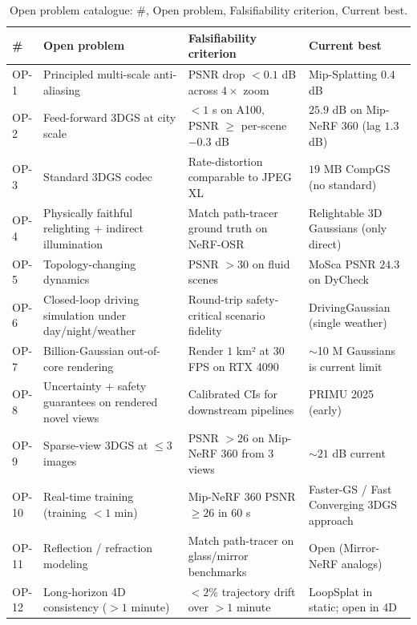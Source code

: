 \documentclass{article}
\begin{document}
\begin{table}[t]
\centering
\caption{Open problem catalogue: \#, Open problem, Falsifiability criterion, Current best.}
\label{tab:open-problem-catalogue}
\begin{tabular}{>{\raggedright\arraybackslash}p{0.0338\linewidth}
  >{\raggedright\arraybackslash}p{0.3716\linewidth}
  >{\raggedright\arraybackslash}p{0.3176\linewidth}
  >{\raggedright\arraybackslash}p{0.2770\linewidth}}
\toprule
\textbf{\#} & \textbf{Open problem} & \textbf{Falsifiability criterion} & \textbf{Current best} \\
\midrule
OP-1 & Principled multi-scale anti-aliasing & PSNR drop \(<0.1\) dB across \(4\times\) zoom & Mip-Splatting \(0.4\) dB \\
OP-2 & Feed-forward 3DGS at city scale & \(<1\) s on A100, PSNR \(\geq\) per-scene \(-0.3\) dB & \(25.9\) dB on Mip-NeRF 360 (lag \(1.3\) dB) \\
OP-3 & Standard 3DGS codec & Rate-distortion comparable to JPEG XL & \(19\) MB CompGS (no standard) \\
OP-4 & Physically faithful relighting + indirect illumination & Match path-tracer ground truth on NeRF-OSR & Relightable 3D Gaussians (only direct) \\
OP-5 & Topology-changing dynamics & PSNR \(>30\) on fluid scenes & MoSca PSNR \(24.3\) on DyCheck \\
OP-6 & Closed-loop driving simulation under day/night/weather & Round-trip safety-critical scenario fidelity & DrivingGaussian (single weather) \\
OP-7 & Billion-Gaussian out-of-core rendering & Render \(1\) km² at \(30\) FPS on RTX 4090 & $\sim$10 M Gaussians is current limit \\
OP-8 & Uncertainty + safety guarantees on rendered novel views & Calibrated CIs for downstream pipelines & PRIMU 2025 (early) \\
OP-9 & Sparse-view 3DGS at \(\leq 3\) images & PSNR \(>26\) on Mip-NeRF 360 from \(3\) views & \(\sim 21\) dB current \\
OP-10 & Real-time training (training \(<1\) min) & Mip-NeRF 360 PSNR \(\geq 26\) in \(60\) s & Faster-GS / Fast Converging 3DGS approach \\
OP-11 & Reflection / refraction modeling & Match path-tracer on glass/mirror benchmarks & Open (Mirror-NeRF analogs) \\
OP-12 & Long-horizon 4D consistency (\(>1\) minute) & \(<2\%\) trajectory drift over \(>1\) minute & LoopSplat in static; open in 4D \\
\end{tabular}
\end{table}
\end{document}

